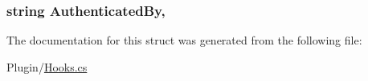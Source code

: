 \subsubsection[{Authenticated\+By}]{\setlength{\rightskip}{0pt plus 5cm}string Authenticated\+By\hspace{0.3cm}{\ttfamily [get]}, {\ttfamily [set]}}\label{structOTA_1_1Plugin_1_1HookArgs_1_1PlayerAuthenticationChanged_a285fa2c208fa2471fb593dfd2f95329c}


The documentation for this struct was generated from the following file\+:\begin{DoxyCompactItemize}
\item 
Plugin/\hyperlink{Hooks_8cs}{Hooks.\+cs}\end{DoxyCompactItemize}
